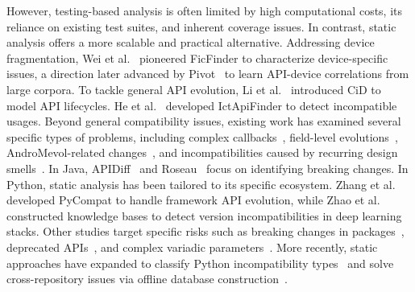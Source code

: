 However, testing-based analysis is often limited by high computational costs, its reliance on existing test suites, and inherent coverage issues. In contrast, static analysis offers a more scalable and practical alternative. Addressing device fragmentation, Wei et al.~\cite{wei2016taming} pioneered FicFinder to characterize device-specific issues, a direction later advanced by Pivot~\cite{wei2019pivot} to learn API-device correlations from large corpora. To tackle general API evolution, Li et al.~\cite{li2018cid} introduced CiD to model API lifecycles. He et al.~\cite{he2018understanding} developed IctApiFinder to detect incompatible usages. Beyond general compatibility issues, existing work has examined several specific types of problems, including complex callbacks~\cite{mahmud2022acid, huang2018understanding}, field-level evolutions~\cite{mahmud2024empirical}, AndroMevol-related changes~\cite{liu2023automatically}, and incompatibilities caused by recurring design smells~\cite{jin2025design}. In Java, APIDiff~\cite{brito2018apidiff} and Roseau~\cite{latappy2025roseau} focus on identifying breaking changes. In Python, static analysis has been tailored to its specific ecosystem. Zhang et al.\cite{zhang2020python} developed PyCompat to handle framework API evolution, while Zhao et al.~\cite{zhao2023knowledge} constructed knowledge bases to detect version incompatibilities in deep learning stacks. Other studies target specific risks such as breaking changes in packages~\cite{du2022aexpy}, deprecated APIs~\cite{vadlamani2021apiscanner}, and complex variadic parameters~\cite{zhang2024coding}. More recently, static approaches have expanded to classify Python incompatibility types~\cite{shen2024static} and solve cross-repository issues via offline database construction~\cite{xie2024pet}.



